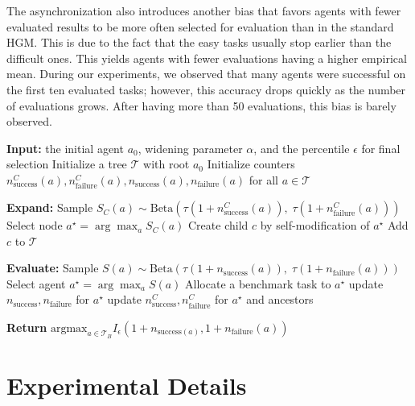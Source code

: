 \documentclass{article}
\begin{document}
The asynchronization also introduces another bias that favors agents with fewer evaluated results to be more often selected for evaluation than in the standard HGM. This is due to the fact that the easy tasks usually stop earlier than the difficult ones. This yields agents with fewer evaluations having a higher empirical mean. During our experiments, we observed that many agents were successful on the first ten evaluated tasks; however, this accuracy drops quickly as the number of evaluations grows. After having more than 50 evaluations, this bias is barely observed.

\begin{algorithm}[h]
\caption{Huxley--G\"odel Machine (HGM)} 
\label{alg:hgm}
\begin{algorithmic}[1]
\STATE \textbf{Input:} the initial agent $a_0$, widening parameter $\alpha$, and the percentile $\epsilon$ for final selection
\STATE Initialize a tree $\mathcal{T}$ with root $a_0$
\STATE Initialize counters $n^C_{\text{success}}(a), n^C_{\text{failure}}(a), n_{\text{success}}(a), n_{\text{failure}}(a)$ for all $a \in \mathcal{T}$

        \STATE \textbf{Expand:}
            \STATE Sample $S_C(a)\sim \text{Beta}(\tau(1+n^C_{\text{success}}(a)),\; \tau(1+n^C_{\text{failure}}(a)))$
        \ENDFOR
        \STATE Select node $a^\star = \arg\max_a S_C(a)$
        \STATE Create child $c$ by self-modification of $a^\star$
        \STATE Add $c$ to $\mathcal{T}$
        
    \ELSE
        \STATE \textbf{Evaluate:}
            \STATE Sample $S(a) \sim \text{Beta}(\tau(1+n_\text{success}(a)),\; \tau(1+n_\text{failure}(a)))$
        \ENDFOR
        \STATE Select agent $a^\star = \arg\max_a S(a)$
        \STATE Allocate a benchmark task to $a^\star$
        \STATE update $n_{\text{success}}, n_{\text{failure}}$ for $a^\star$
        \STATE update $n^C_{\text{success}}, n^C_{\text{failure}}$ for $a^\star$ and ancestors
        
    \ENDIF
\ENDWHILE
\STATE \textbf{Return} $\text{argmax}_{a\in \mathcal{T}_B} I_\epsilon(1 + n_{\text{success}(a)}, 1 + n_{\text{failure}}(a))$
\end{algorithmic}
\end{algorithm}

\newpage
\section{Experimental Details}
\end{document}
